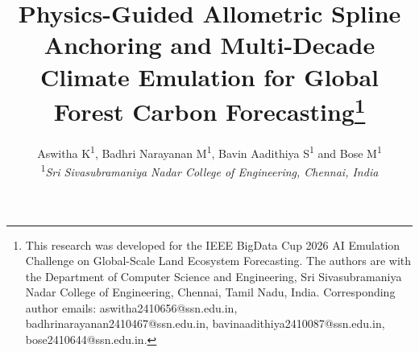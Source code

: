 \documentclass[conference]{IEEEtran}
\begin{document}
\title{Physics-Guided Allometric Spline Anchoring and Multi-Decade Climate Emulation for Global Forest Carbon Forecasting\thanks{This research was developed for the IEEE BigData Cup 2026 AI Emulation Challenge on Global-Scale Land Ecosystem Forecasting. The authors are with the Department of Computer Science and Engineering, Sri Sivasubramaniya Nadar College of Engineering, Chennai, Tamil Nadu, India. Corresponding author emails: aswitha2410656@ssn.edu.in, badhrinarayanan2410467@ssn.edu.in, bavinaadithiya2410087@ssn.edu.in, bose2410644@ssn.edu.in.}}

\author{
Aswitha K\textsuperscript{1}, Badhri Narayanan M\textsuperscript{1}, Bavin Aadithiya S\textsuperscript{1} and Bose M\textsuperscript{1}\\
\textsuperscript{1}\textit{Sri Sivasubramaniya Nadar College of Engineering, Chennai, India}
}
\end{document}
